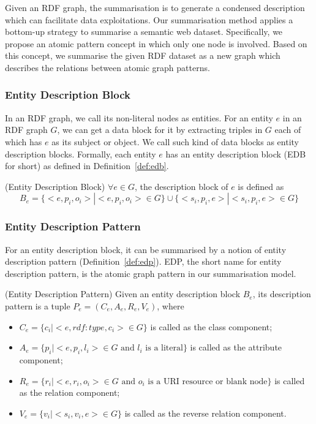 \vspace{-2mm}
Given an RDF graph, the summarisation is to generate a condensed description which can facilitate data exploitations. Our summarisation method applies a bottom-up strategy to summarise a semantic web dataset. Specifically, we propose an atomic pattern concept in which only one node is involved. Based on this concept, we summarise the given RDF dataset as a new graph which describes the relations between atomic graph patterns.

\vspace{-4ex}
\subsubsection{Entity Description Block}
In an RDF graph, we call its non-literal nodes as entities. For an entity $e$ in an RDF graph $G$, we can get a data block for it by extracting triples in $G$ each of which has $e$ as its subject or object. We call such kind of data blocks as entity description blocks. Formally, each entity $e$ has an entity description block (EDB for short) as defined in Definition~\ref{def:edb}.
\vspace{-1ex}
\begin{definition}
\label{def:edb}
 (Entity Description Block)
$\forall e \in G$, the description block of $e$ is defined as 
\begin{equation}
B_e= \{<e,p_i,o_i>|<e,p_i,o_i> \in G\} \cup \{<s_i,p_i,e>|<s_i,p_i,e> \in G\}
\end{equation}
\end{definition}

\vspace{-3ex}
\subsubsection{Entity Description Pattern}
For an entity description block, it can be summarised by a notion of entity description pattern (Definition~\ref{def:edp}). EDP, the short name for entity description pattern, is the atomic graph pattern in our summarisation model. 
\vspace{-1ex}
\begin{definition}
\label{def:edp} 
(Entity Description Pattern) Given an entity description block $B_e$, its description pattern is a tuple $P_e=(C_e,A_e,R_e,V_e)$, where
\begin{itemize}
\item $C_e=\{c_i |<e, rdf:type,c_i> \in G\}$   is called as the class component; 
\item $A_e=\{p_i |<e,p_i,l_i> \in G \text{ and $l_i$  is a literal}\}$  is called as the attribute component;
\item $R_e=\{r_i |<e,r_i,o_i> \in G \text{ and $o_i$  is a URI resource or blank node}\}$  is called as the relation component;
\item $V_e=\{v_i |<s_i,v_i,e> \in G\}$ is called as the reverse relation component.
\end{itemize}
\end{definition}

